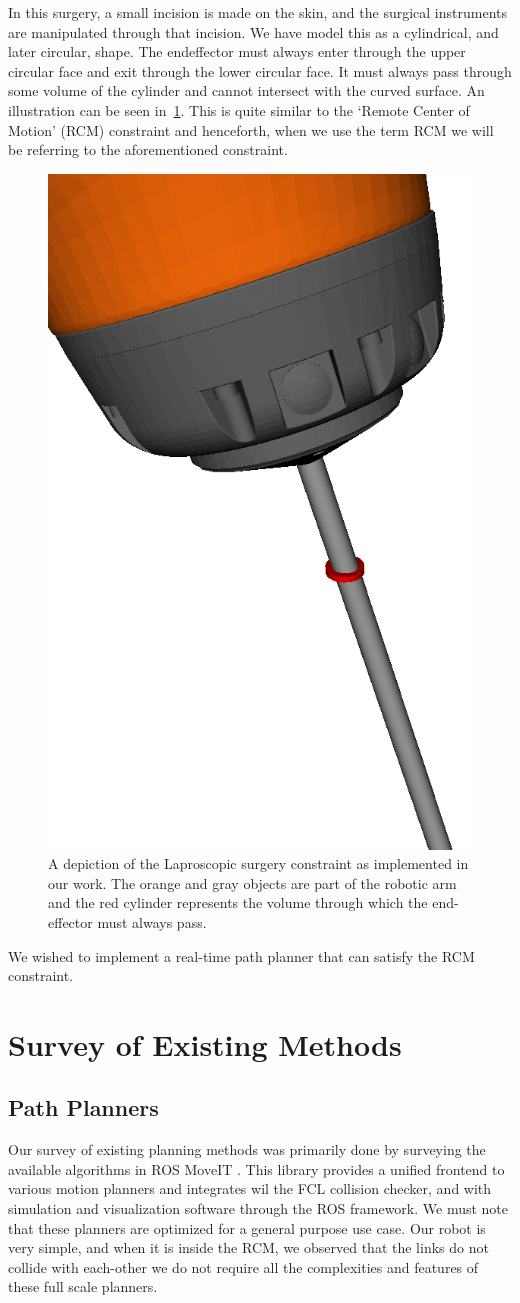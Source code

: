 \documentclass[BTech]{iitmdiss}
\begin{document}
    In this surgery, a small incision is made on the skin, and the surgical instruments are manipulated through that incision.
    We have model this as a cylindrical, and later circular, shape.
    The endeffector must always enter through the upper circular face and exit through the lower circular face.
    It must always pass through some volume of the cylinder and cannot intersect with the curved surface.
    An illustration can be seen in~\ref{fig:RCM}.
    This is quite similar to the `Remote Center of Motion' (RCM) constraint and henceforth, when we use the term RCM we will be referring to the aforementioned constraint.

    \begin{figure}
        \centering
        \includegraphics[height= 0.5\textwidth]{./img/rcm-constraint}
        \caption{A depiction of the Laproscopic surgery constraint as implemented in our work. The orange and gray objects are part of the robotic arm and the red cylinder represents the volume through which the end-effector must always pass.}
        \label{fig:RCM}
    \end{figure}

    We wished to implement a real-time path planner that can satisfy the RCM constraint.


    \section{Survey of Existing Methods}

    \subsection{Path Planners}
    Our survey of existing planning methods was primarily done by surveying the available algorithms in ROS MoveIT \cite{Coleman_Sucan_Chitta_Correll_2014}.
    This library provides a unified frontend to various motion planners and integrates wil the FCL collision checker, and with simulation and visualization software through the ROS framework.
    We must note that these planners are optimized for a general purpose use case.
    Our robot is very simple, and when it is inside the RCM, we observed that the links do not collide with each-other we do not require all the complexities and features of these full scale planners.
\end{document}
